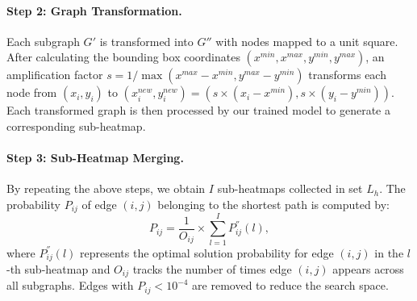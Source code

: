 \documentclass[sigconf]{acmart}
\begin{document}
\paragraph{Step 2: Graph Transformation.} Each subgraph $G'$ is transformed into $G''$ with nodes mapped to a unit square. After calculating the bounding box coordinates $(x^{min}, x^{max}, y^{min}, y^{max})$, an amplification factor $s = 1/\max(x^{max}-x^{min}, y^{max}-y^{min})$ transforms each node from $(x_i,y_i)$ to $(x_i^{new},y_i^{new})=(s \times (x_i - x^{min}), s \times (y_i - y^{min}))$. Each transformed graph is then processed by our trained model to generate a corresponding sub-heatmap.

\paragraph{Step 3: Sub-Heatmap Merging.} By repeating the above steps, we obtain $I$ sub-heatmaps collected in set $L_h$. The probability $P_{ij}$ of edge $(i,j)$ belonging to the shortest path is computed by:
\begin{equation}
     P_{ij}=\frac{1}{O_{ij}}\times\sum_{l=1}^{I}P_{ij}^{''}(l),
\end{equation}
where $P_{ij}^{''}(l)$ represents the optimal solution probability for edge $(i,j)$ in the $l$-th sub-heatmap and $O_{ij}$ tracks the number of times edge $(i,j)$ appears across all subgraphs. Edges with $P_{ij}<10^{-4}$ are removed to reduce the search space.



\end{document}
